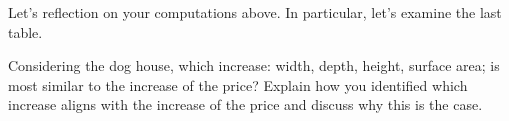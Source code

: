 \documentclass[nooutcomes,noauthor,handout]{../ximera}
\begin{document}




\begin{question}
  Let's reflection on your computations above. In particular, let's
  examine the last table.
 
 Considering the dog house, which increase: width, depth,
      height, surface area; is most similar to the increase of
      the price? Explain how you identified which increase aligns with
      the increase of the price and discuss why this is the case.
   \end{question}
\end{document}
